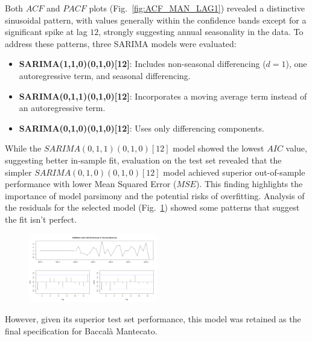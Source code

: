 \documentclass[10pt,twocolumn,letterpaper]{article}
\begin{document}
Both $ACF$ and $PACF$ plots (Fig.~\ref{fig:ACF_MAN_LAG1}) revealed a distinctive sinusoidal pattern, with values generally within the confidence bands except for a significant spike at lag $12$, strongly suggesting annual seasonality in the data.
To address these patterns, three SARIMA models were evaluated:
\begin{itemize}[noitemsep, topsep=0pt]
    \item \textbf{SARIMA(1,1,0)(0,1,0)[12]}: Includes non-seasonal differencing ($d=1$), one autoregressive term, and seasonal differencing.
    \item \textbf{SARIMA(0,1,1)(0,1,0)[12]}: Incorporates a moving average term instead of an autoregressive term.
    \item \textbf{SARIMA(0,1,0)(0,1,0)[12]}: Uses only differencing components.
\end{itemize}

While the $SARIMA(0,1,1)(0,1,0)[12]$ model showed the lowest $AIC$ value, suggesting better in-sample fit, evaluation on the test set revealed that the simpler $SARIMA(0,1,0)(0,1,0)[12]$ model achieved superior out-of-sample performance with lower Mean Squared Error ($MSE$). This finding highlights the importance of model parsimony and the potential risks of overfitting.
Analysis of the residuals for the selected model (Fig.~\ref{fig:RES_ACF_SARIMA_MAN}) showed some patterns that suggest the fit isn't perfect.
\begin{figure}[H]
    \centering
    \includegraphics[width=0.5\textwidth]{PlotsBEFD/RES_ACF_SARIMA_MAN.png} 
    \caption{}
    \label{fig:RES_ACF_SARIMA_MAN}
\end{figure}

However, given its superior test set performance, this model was retained as the final specification for Baccalà Mantecato.
\end{document}
